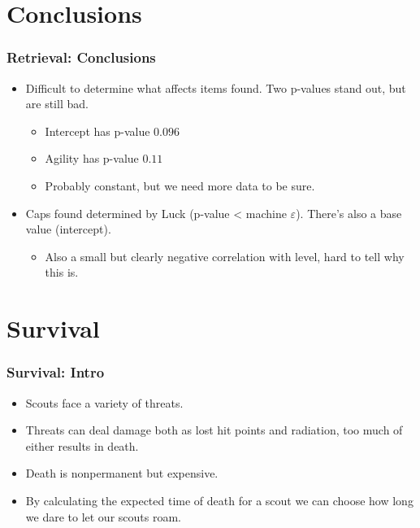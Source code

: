 \documentclass{beamer}
\begin{document}
\section{Conclusions}
\begin{frame}
  \frametitle{Retrieval: Conclusions}
  \begin{itemize}
  \item Difficult to determine what affects items found. Two p-values stand out, but are still bad.
    \begin{itemize}
    \item Intercept has p-value $0.096$
    \item Agility has p-value $0.11$
    \item<2-> Probably constant, but we need more data to be sure.
    \end{itemize}
  \item<3-> Caps found determined by Luck (p-value < machine $\varepsilon$). There's also a base value (intercept).
  \begin{itemize}
  \item Also a small but clearly negative correlation with level, hard to tell why this is.
  \end{itemize}
  \end{itemize}
\end{frame}

\section{Survival}
\begin{frame}
  \frametitle{Survival: Intro}
  \begin{itemize}
  \item Scouts face a variety of threats.
  \item Threats can deal damage both as lost hit points and radiation, too much of either results in death.
  \item Death is nonpermanent but expensive.
  \item By calculating the expected time of death for a scout we can choose how long we dare to let our scouts roam.
  \end{itemize}
\end{frame}
\end{document}
